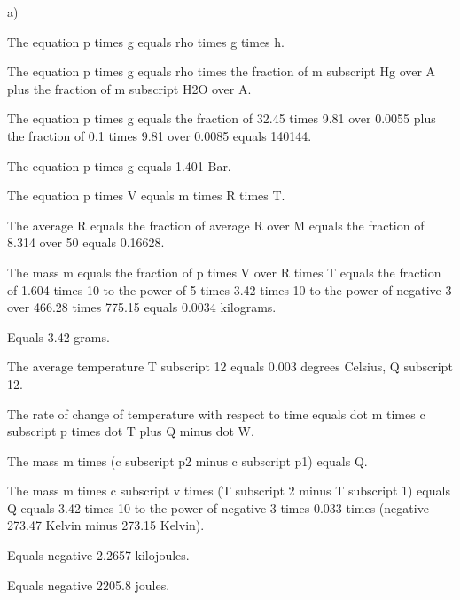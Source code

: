 a)

The equation p times g equals rho times g times h.

The equation p times g equals rho times the fraction of m subscript Hg over A plus the fraction of m subscript H2O over A.

The equation p times g equals the fraction of 32.45 times 9.81 over 0.0055 plus the fraction of 0.1 times 9.81 over 0.0085 equals 140144.

The equation p times g equals 1.401 Bar.

The equation p times V equals m times R times T.

The average R equals the fraction of average R over M equals the fraction of 8.314 over 50 equals 0.16628.

The mass m equals the fraction of p times V over R times T equals the fraction of 1.604 times 10 to the power of 5 times 3.42 times 10 to the power of negative 3 over 466.28 times 775.15 equals 0.0034 kilograms.

Equals 3.42 grams.

The average temperature T subscript 12 equals 0.003 degrees Celsius, Q subscript 12.

The rate of change of temperature with respect to time equals dot m times c subscript p times dot T plus Q minus dot W.

The mass m times (c subscript p2 minus c subscript p1) equals Q.

The mass m times c subscript v times (T subscript 2 minus T subscript 1) equals Q equals 3.42 times 10 to the power of negative 3 times 0.033 times (negative 273.47 Kelvin minus 273.15 Kelvin).

Equals negative 2.2657 kilojoules.

Equals negative 2205.8 joules.